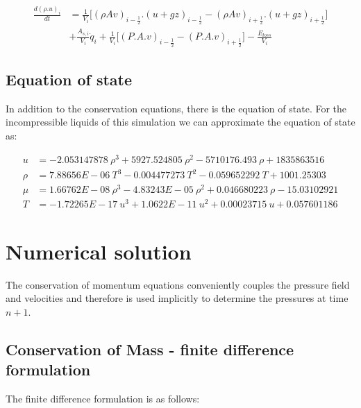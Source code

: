 \documentclass[11pt,letterpaper,titlepage]{article}
\newcommand{\half}{\frac{1}{2}}
\begin{document}
\begin{equation}
\begin{aligned}
\frac{d(\rho.u)_i}{dt} &=\frac{1}{V_i}\biggr[ (\rho Av)_{i-\half}.(u+gz)_{i-\half} - (\rho Av)_{i+\half}.(u+gz)_{i+\half} \biggr] \\
&+\frac{A_{s,i}}{V_i}\dot{q}_i + \frac{1}{V_i}\biggr[   (P.A.v)_{i-\half} - (P.A.v)_{i+\half}   \biggr] - \frac{E_{loss}}{V_i}
\end{aligned}
\end{equation}



\subsection{Equation of state}
In addition to the conservation equations, there is the equation of state. For the incompressible liquids of this simulation we can approximate the equation of state as:

\begin{equation}
\begin{aligned}
u&=-2.053147878 \ \rho^3+5927.524805 \ \rho^2-5710176.493 \ \rho+1835863516 \\
\rho&=7.88656E-06 \ T^3-0.004477273 \ T^2-0.059652292 \ T+1001.25303\\
\mu&=1.66762E-08 \ \rho^3-4.83243E-05 \ \rho^2+0.046680223 \ \rho-15.03102921\\
T&=-1.72265E-17 \ u^3+1.0622E-11 \ u^2+0.00023715\ u+0.057601186
\end{aligned}
\end{equation}


















\newpage
{}
\section{Numerical solution}
The conservation of momentum equations conveniently couples the pressure field and velocities and therefore is used implicitly to determine the pressures at time $n+1$.

\subsection{Conservation of Mass - finite difference formulation}
The finite difference formulation is as follows:
\end{document}

